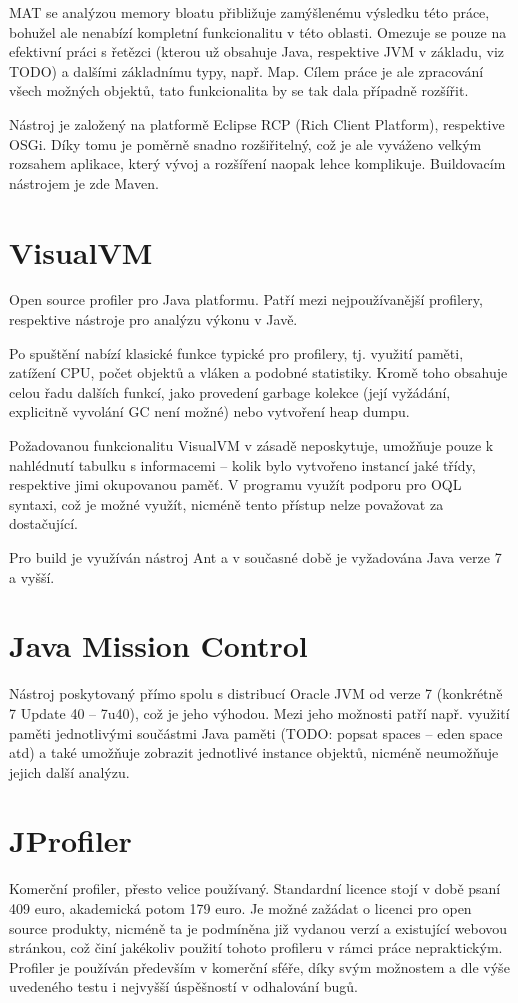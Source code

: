 MAT se analýzou memory bloatu přibližuje zamýšlenému výsledku této práce, bohužel ale nenabízí kompletní funkcionalitu v této oblasti. Omezuje se pouze na efektivní práci s řetězci (kterou už obsahuje Java, respektive JVM v základu, viz TODO) a dalšími základnímu typy, např. Map. Cílem práce je ale zpracování všech možných objektů, tato funkcionalita by se tak dala případně rozšířit.

Nástroj je založený na platformě Eclipse RCP (Rich Client Platform), respektive OSGi. Díky tomu je poměrně snadno rozšiřitelný, což je ale vyváženo velkým rozsahem aplikace, který vývoj a rozšíření naopak lehce komplikuje. Buildovacím nástrojem je zde Maven.

\section{VisualVM}
Open source profiler pro Java platformu. Patří mezi nejpoužívanější profilery, respektive nástroje pro analýzu výkonu v Javě.

Po spuštění nabízí klasické funkce typické pro profilery, tj. využití paměti, zatížení CPU, počet objektů a vláken a podobné statistiky. Kromě toho obsahuje celou řadu dalších funkcí, jako provedení garbage kolekce (její vyžádání, explicitně vyvolání GC není možné) nebo vytvoření heap dumpu.

Požadovanou funkcionalitu VisualVM v zásadě neposkytuje, umožňuje pouze k nahlédnutí tabulku s informacemi – kolik bylo vytvořeno instancí jaké třídy, respektive jimi okupovanou paměť. V programu využít podporu pro OQL syntaxi, což je možné využít, nicméně tento přístup nelze považovat za dostačující.

Pro build je využíván nástroj Ant a v současné době je vyžadována Java verze 7 a vyšší.

\section{Java Mission Control}
Nástroj poskytovaný přímo spolu s distribucí Oracle JVM od verze 7 (konkrétně 7 Update 40 – 7u40), což je jeho výhodou. Mezi jeho možnosti patří např. využití paměti jednotlivými součástmi Java paměti (TODO: popsat spaces – eden space atd) a také umožňuje zobrazit jednotlivé instance objektů, nicméně neumožňuje jejich další analýzu.

\section{JProfiler}
Komerční profiler, přesto velice používaný. Standardní licence stojí v době psaní 409 euro, akademická potom 179 euro. Je možné zažádat o licenci pro open source produkty, nicméně ta je podmíněna již vydanou verzí a existující webovou stránkou, což činí jakékoliv použití tohoto profileru v rámci práce nepraktickým. Profiler je používán především v komerční sféře, díky svým možnostem a dle výše uvedeného testu i nejvyšší úspěšností v odhalování bugů.

